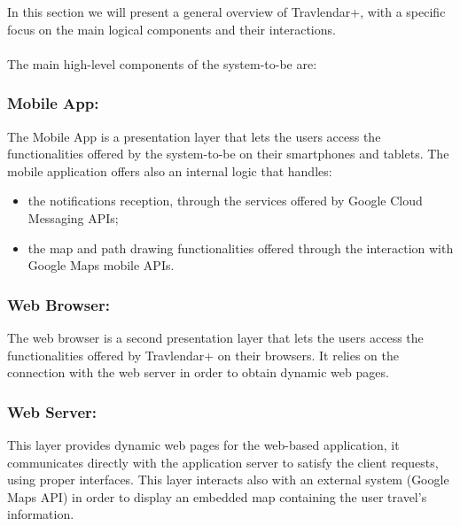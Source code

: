 In this section we will present a general overview of Travlendar+, with a specific focus on the main logical components and their interactions. \\ \\
The main high-level components of the system-to-be are:
\subsubsection{Mobile App:}
\label{subsubsect:Mobile App}
The Mobile App is a presentation layer that lets the users access the functionalities offered by the system-to-be on their smartphones and tablets. The mobile application offers also an internal logic that handles:
\begin{itemize}
	\item the notifications reception, through the services offered by Google Cloud Messaging APIs;
	\item the map and path drawing functionalities offered through the interaction with Google Maps mobile APIs.
\end{itemize}  

\subsubsection{Web Browser:}
\label{subsubsect:Web Browser}
The web browser is a second presentation layer that lets the users access the functionalities offered by Travlendar+ on their browsers.
It relies on the connection with the web server in order to obtain dynamic web pages.

\subsubsection{Web Server:}
\label{subsubsect:Web Server}
This layer provides dynamic web pages for the web-based application, it communicates directly with the application server to satisfy the client requests, using proper interfaces. This layer interacts also with an external system (Google Maps API) in order to display an embedded map containing the user travel's information.

